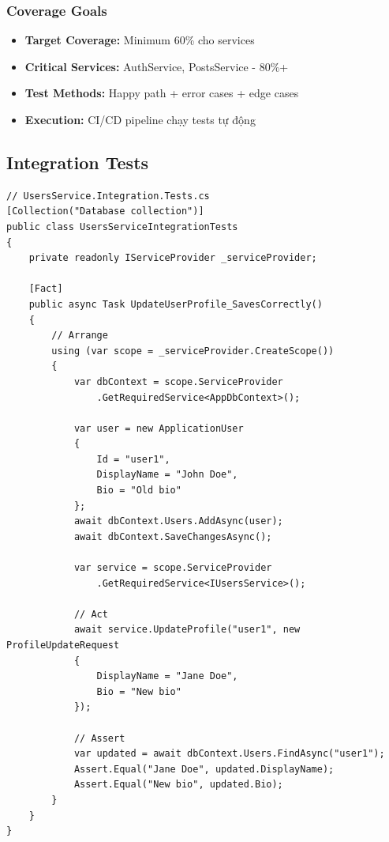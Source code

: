 \subsubsection{Coverage Goals}
\begin{itemize}
    \item \textbf{Target Coverage:} Minimum 60\% cho services
    \item \textbf{Critical Services:} AuthService, PostsService - 80\%+
    \item \textbf{Test Methods:} Happy path + error cases + edge cases
    \item \textbf{Execution:} CI/CD pipeline chạy tests tự động
\end{itemize}

\subsection{Integration Tests}

\begin{verbatim}
// UsersService.Integration.Tests.cs
[Collection("Database collection")]
public class UsersServiceIntegrationTests
{
    private readonly IServiceProvider _serviceProvider;
    
    [Fact]
    public async Task UpdateUserProfile_SavesCorrectly()
    {
        // Arrange
        using (var scope = _serviceProvider.CreateScope())
        {
            var dbContext = scope.ServiceProvider
                .GetRequiredService<AppDbContext>();
            
            var user = new ApplicationUser 
            { 
                Id = "user1",
                DisplayName = "John Doe",
                Bio = "Old bio"
            };
            await dbContext.Users.AddAsync(user);
            await dbContext.SaveChangesAsync();
            
            var service = scope.ServiceProvider
                .GetRequiredService<IUsersService>();
            
            // Act
            await service.UpdateProfile("user1", new ProfileUpdateRequest
            {
                DisplayName = "Jane Doe",
                Bio = "New bio"
            });
            
            // Assert
            var updated = await dbContext.Users.FindAsync("user1");
            Assert.Equal("Jane Doe", updated.DisplayName);
            Assert.Equal("New bio", updated.Bio);
        }
    }
}
\end{verbatim}

